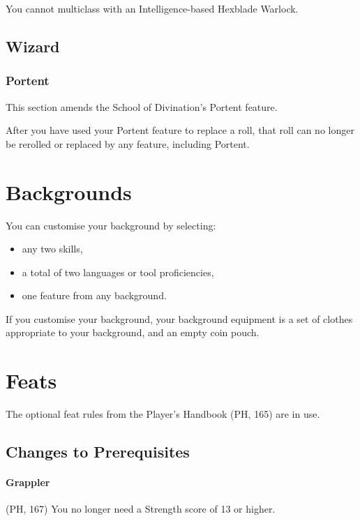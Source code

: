 \documentclass[letterpaper,twocolumn,openany,nodeprecatedcode]{dndbook}
\begin{document}
You cannot multiclass with an Intelligence-based Hexblade Warlock.

\subsection{Wizard}

\subsubsection{Portent}
This section amends the School of Divination's Portent feature.

After you have used your Portent feature to replace a roll, that roll can no longer be rerolled or replaced by any feature, including Portent.




\section{Backgrounds}
You can customise your background by selecting:

\begin{itemize}
    \item any two skills,
    \item a total of two languages or tool proficiencies,
    \item one feature from any background.
\end{itemize}

If you customise your background, your background equipment is a set of clothes appropriate to your background, and an empty coin pouch.





\section{Feats}
The optional feat rules from the Player's Handbook (PH, 165) are in use.

\subsection{Changes to Prerequisites}

\paragraph{Grappler} (PH, 167) You no longer need a Strength score of 13 or higher.
\end{document}
